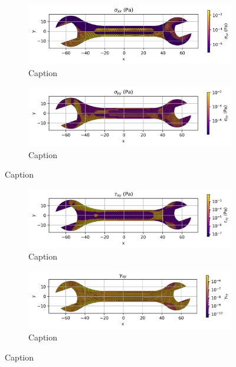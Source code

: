   \begin{figure}[H]
    \centering
    \begin{subfigure}[t]{0.49\textwidth}
      \centering
      \includegraphics[width=\textwidth]{GRAFICOS/Case d - sigma_xx_per_element.png}
      \caption{Caption}
      \label{fig:deformada_reacciones}
    \end{subfigure}
    \hfill
    \begin{subfigure}[t]{0.49\textwidth}
      \centering
      \includegraphics[width=\textwidth]{GRAFICOS/Case d - sigma_yy_per_element.png}
      \caption{Caption}
      \label{fig:von_mises}
    \end{subfigure}
    \caption{Caption}
    \label{fig:analisis_estructural}
  \end{figure}

  \begin{figure}[H]
    \centering
    \begin{subfigure}[t]{0.49\textwidth}
      \centering
      \includegraphics[width=\textwidth]{GRAFICOS/Case d - tau_xy_per_element.png}
      \caption{Caption}
      \label{fig:deformada_reacciones}
    \end{subfigure}
    \hfill
    \begin{subfigure}[t]{0.49\textwidth}
      \centering
      \includegraphics[width=\textwidth]{GRAFICOS/Case d - gamma_xy_per_element.png}
      \caption{Caption}
      \label{fig:von_mises}
    \end{subfigure}
    \caption{Caption}
    \label{fig:analisis_estructural}
    \end{figure}

